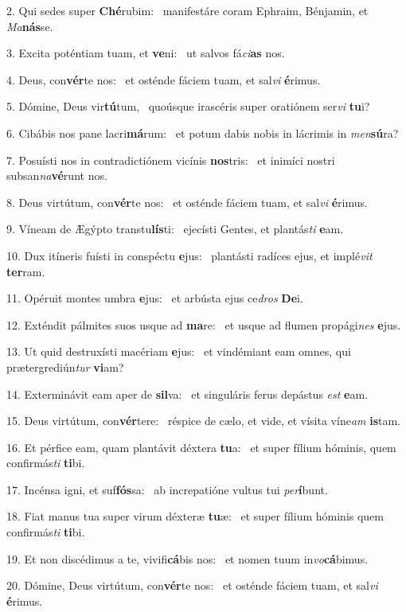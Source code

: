 2. Qui sedes super \textbf{Ché}rubim: \ast\  manifestáre coram Ephraim, Bénjamin, et \textit{Ma}\textbf{nás}se.\

3. Excita poténtiam tuam, et \textbf{ve}ni: \ast\  ut salvos fá\textit{ci}\textbf{as} nos.\

4. Deus, con\textbf{vér}te nos: \ast\  et osténde fáciem tuam, et sal\textit{vi} \textbf{é}rimus.\

5. Dómine, Deus vir\textbf{tú}tum, \ast\  quoúsque irascéris super oratiónem ser\textit{vi} \textbf{tu}i?\

6. Cibábis nos pane lacri\textbf{má}rum: \ast\  et potum dabis nobis in lácrimis in \textit{men}\textbf{sú}ra?\

7. Posuísti nos in contradictiónem vicínis \textbf{nos}tris: \ast\  et inimíci nostri subsan\textit{na}\textbf{vé}runt nos.\

8. Deus virtútum, con\textbf{vér}te nos: \ast\  et osténde fáciem tuam, et sal\textit{vi} \textbf{é}rimus.\

9. Víneam de Ægýpto transtu\textbf{lís}ti: \ast\  ejecísti Gentes, et plantás\textit{ti} \textbf{e}am.\

10. Dux itíneris fuísti in conspéctu \textbf{e}jus: \ast\  plantásti radíces ejus, et implé\textit{vit} \textbf{ter}ram.\

11. Opéruit montes umbra \textbf{e}jus: \ast\  et arbústa ejus ce\textit{dros} \textbf{De}i.\

12. Exténdit pálmites suos usque ad \textbf{ma}re: \ast\  et usque ad flumen propági\textit{nes} \textbf{e}jus.\

13. Ut quid destruxísti macériam \textbf{e}jus: \ast\  et vindémiant eam omnes, qui prætergrediún\textit{tur} \textbf{vi}am?\

14. Exterminávit eam aper de \textbf{sil}va: \ast\  et singuláris ferus depástus \textit{est} \textbf{e}am.\

15. Deus virtútum, con\textbf{vér}tere: \ast\  réspice de cælo, et vide, et vísita víne\textit{am} \textbf{is}tam.\

16. Et pérfice eam, quam plantávit déxtera \textbf{tu}a: \ast\  et super fílium hóminis, quem confirmás\textit{ti} \textbf{ti}bi.\

17. Incénsa igni, et suf\textbf{fós}sa: \ast\  ab increpatióne vultus tui \textit{per}\textbf{í}bunt.\

18. Fiat manus tua super virum déxteræ \textbf{tu}æ: \ast\  et super fílium hóminis quem confirmás\textit{ti} \textbf{ti}bi.\

19. Et non discédimus a te, vivifi\textbf{cá}bis nos: \ast\  et nomen tuum in\textit{vo}\textbf{cá}bimus.\

20. Dómine, Deus virtútum, con\textbf{vér}te nos: \ast\  et osténde fáciem tuam, et sal\textit{vi} \textbf{é}rimus.\

